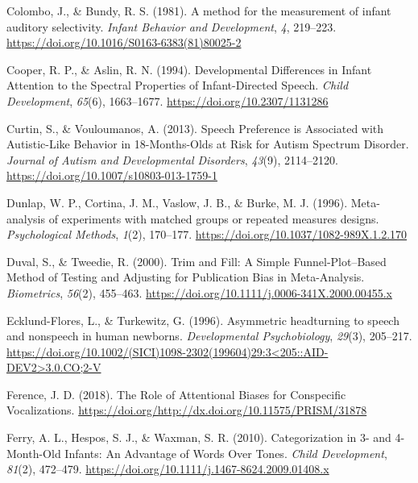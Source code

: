\documentclass[man]{apa6}
\begin{document}
\leavevmode\hypertarget{ref-colombo_method_1981}{}%
Colombo, J., \& Bundy, R. S. (1981). A method for the measurement of infant auditory selectivity. \emph{Infant Behavior and Development}, \emph{4}, 219--223. \url{https://doi.org/10.1016/S0163-6383(81)80025-2}

\leavevmode\hypertarget{ref-cooper_developmental_1994}{}%
Cooper, R. P., \& Aslin, R. N. (1994). Developmental Differences in Infant Attention to the Spectral Properties of Infant-Directed Speech. \emph{Child Development}, \emph{65}(6), 1663--1677. \url{https://doi.org/10.2307/1131286}

\leavevmode\hypertarget{ref-curtin_speech_2013}{}%
Curtin, S., \& Vouloumanos, A. (2013). Speech Preference is Associated with Autistic-Like Behavior in 18-Months-Olds at Risk for Autism Spectrum Disorder. \emph{Journal of Autism and Developmental Disorders}, \emph{43}(9), 2114--2120. \url{https://doi.org/10.1007/s10803-013-1759-1}

\leavevmode\hypertarget{ref-dunlap_meta-analysis_1996}{}%
Dunlap, W. P., Cortina, J. M., Vaslow, J. B., \& Burke, M. J. (1996). Meta-analysis of experiments with matched groups or repeated measures designs. \emph{Psychological Methods}, \emph{1}(2), 170--177. \url{https://doi.org/10.1037/1082-989X.1.2.170}

\leavevmode\hypertarget{ref-duval_trim_2000}{}%
Duval, S., \& Tweedie, R. (2000). Trim and Fill: A Simple Funnel-Plot--Based Method of Testing and Adjusting for Publication Bias in Meta-Analysis. \emph{Biometrics}, \emph{56}(2), 455--463. \url{https://doi.org/10.1111/j.0006-341X.2000.00455.x}

\leavevmode\hypertarget{ref-ecklund-flores_asymmetric_1996}{}%
Ecklund-Flores, L., \& Turkewitz, G. (1996). Asymmetric headturning to speech and nonspeech in human newborns. \emph{Developmental Psychobiology}, \emph{29}(3), 205--217. \href{https://doi.org/10.1002/(SICI)1098-2302(199604)29:3\%3C205::AID-DEV2\%3E3.0.CO;2-V}{https://doi.org/10.1002/(SICI)1098-2302(199604)29:3\textless{}205::AID-DEV2\textgreater{}3.0.CO;2-V}

\leavevmode\hypertarget{ref-ference_role_2018}{}%
Ference, J. D. (2018). The Role of Attentional Biases for Conspecific Vocalizations. \url{https://doi.org/http://dx.doi.org/10.11575/PRISM/31878}

\leavevmode\hypertarget{ref-ferry_categorization_2010}{}%
Ferry, A. L., Hespos, S. J., \& Waxman, S. R. (2010). Categorization in 3- and 4-Month-Old Infants: An Advantage of Words Over Tones. \emph{Child Development}, \emph{81}(2), 472--479. \url{https://doi.org/10.1111/j.1467-8624.2009.01408.x}
\end{document}
